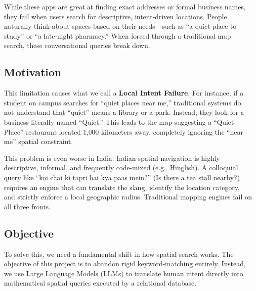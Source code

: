 \documentclass[11pt,a4paper]{article}
\begin{document}
While these apps are great at finding exact addresses or formal business names, they fail when users search for descriptive, intent-driven locations. People naturally think about spaces based on their needs---such as ``a quiet place to study'' or ``a late-night pharmacy.'' When forced through a traditional map search, these conversational queries break down.

\subsection{Motivation}
This limitation causes what we call a \textbf{Local Intent Failure}. For instance, if a student on campus searches for ``quiet places near me,'' traditional systems do not understand that ``quiet'' means a library or a park. Instead, they look for a business literally named ``Quiet.'' This leads to the map suggesting a ``Quiet Place'' restaurant located 1,000 kilometers away, completely ignoring the ``near me'' spatial constraint.

This problem is even worse in India. Indian spatial navigation is highly descriptive, informal, and frequently code-mixed (e.g., Hinglish). A colloquial query like ``koi chai ki tapri hai kya paas mein?'' (Is there a tea stall nearby?) requires an engine that can translate the slang, identify the location category, and strictly enforce a local geographic radius. Traditional mapping engines fail on all three fronts.

\subsection{Objective}
To solve this, we need a fundamental shift in how spatial search works. The objective of this project is to abandon rigid keyword-matching entirely. Instead, we use Large Language Models (LLMs) to translate human intent directly into mathematical spatial queries executed by a relational database.
\end{document}
